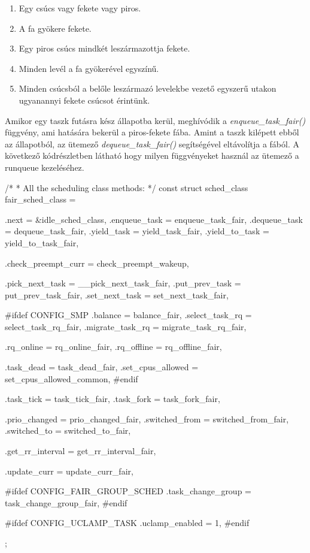 \begin{enumerate}
	\item Egy csúcs vagy fekete vagy piros.
	\item A fa gyökere fekete.
	\item Egy piros csúcs mindkét leszármazottja fekete.
	\item Minden levél a fa gyökerével egyszínű. 
	\item Minden csúcsból a belőle leszármazó levelekbe vezető egyszerű utakon ugyanannyi fekete csúcsot érintünk.
\end{enumerate}

Amikor egy taszk futásra kész állapotba kerül, meghívódik a \textit{enqueue\_task\_fair()}  függvény, ami hatására bekerül a piros-fekete fába. Amint a taszk kilépett ebből az állapotból, az ütemező \textit{dequeue\_task\_fair()} segítségével eltávolítja a fából.
A következő kódrészletben látható hogy milyen függvényeket használ az ütemező a runqueue kezeléséhez.

\begin{cpp}
/*
 * All the scheduling class methods:
 */
const struct sched_class fair_sched_class = {
	.next			= &idle_sched_class,
	.enqueue_task		= enqueue_task_fair,
	.dequeue_task		= dequeue_task_fair,
	.yield_task		= yield_task_fair,
	.yield_to_task		= yield_to_task_fair,

	.check_preempt_curr	= check_preempt_wakeup,

	.pick_next_task		= __pick_next_task_fair,
	.put_prev_task		= put_prev_task_fair,
	.set_next_task          = set_next_task_fair,

#ifdef CONFIG_SMP
	.balance		= balance_fair,
	.select_task_rq		= select_task_rq_fair,
	.migrate_task_rq	= migrate_task_rq_fair,

	.rq_online		= rq_online_fair,
	.rq_offline		= rq_offline_fair,

	.task_dead		= task_dead_fair,
	.set_cpus_allowed	= set_cpus_allowed_common,
#endif

	.task_tick		= task_tick_fair,
	.task_fork		= task_fork_fair,

	.prio_changed		= prio_changed_fair,
	.switched_from		= switched_from_fair,
	.switched_to		= switched_to_fair,

	.get_rr_interval	= get_rr_interval_fair,

	.update_curr		= update_curr_fair,

#ifdef CONFIG_FAIR_GROUP_SCHED
	.task_change_group	= task_change_group_fair,
#endif

#ifdef CONFIG_UCLAMP_TASK
	.uclamp_enabled		= 1,
#endif
};
\end{cpp}

